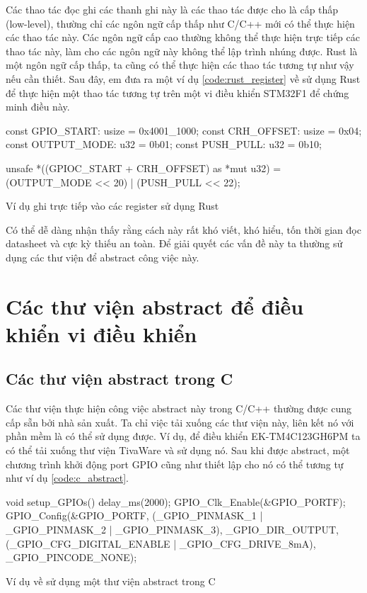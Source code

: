 Các thao tác đọc ghi các thanh ghi này là các thao tác được cho là cấp thấp (low-level), thường chỉ các ngôn ngữ cấp thấp như C/C++ mới có thể thực hiện các thao tác này.
Các ngôn ngữ cấp cao thường không thể thực hiện trực tiếp các thao tác này, làm cho các ngôn ngữ này không thể lập trình nhúng được.
Rust là một ngôn ngữ cấp thấp,  ta cũng có thể thực hiện các thao tác tương tự như vậy nếu cần thiết.
Sau đây, em đưa ra một ví dụ \ref{code:rust_register} về sử dụng Rust để thực hiện một thao tác tương tự trên một vi điều khiển STM32F1 để chứng minh điều này.
\begin{listing}[ht]
\begin{rustcode}
const GPIO_START: usize = 0x4001_1000;
const CRH_OFFSET: usize = 0x04;
const OUTPUT_MODE: u32 = 0b01;
const PUSH_PULL: u32 = 0b10;

unsafe {
    *((GPIOC_START + CRH_OFFSET) as *mut u32) = (OUTPUT_MODE << 20) | (PUSH_PULL << 22);
}
\end{rustcode}
\caption{Ví dụ ghi trực tiếp vào các register sử dụng Rust}
\label{code:rust_register}
\end{listing}

Có thể dễ dàng nhận thấy rằng cách này rất khó viết, khó hiểu, tốn thời gian đọc datasheet và cực kỳ thiếu an toàn.
Để giải quyết các vấn đề này ta thường sử dụng các thư viện để abstract công việc này.
\section{Các thư viện abstract để điều khiển vi điều khiển}
\subsection{Các thư viện abstract trong C}
Các thư viện thực hiện công việc abstract này trong C/C++ thường được cung cấp sẵn bởi nhà sản xuất.
Ta chỉ việc tải xuống các thư viện này, liên kết nó với phần mềm là có thể sử dụng được.
Ví dụ, để điều khiển EK-TM4C123GH6PM ta có thể tải xuống thư viện TivaWare \cite{tivac_tivaware} và sử dụng nó.
Sau khi được abstract, một chương trình khởi động port GPIO cũng như thiết lập cho nó có thể tương tự như ví dụ \ref{code:c_abstract}.
\begin{listing}[ht]
\begin{ccode}
void setup_GPIOs()
{
     delay_ms(2000);
     GPIO_Clk_Enable(&GPIO_PORTF);
     GPIO_Config(&GPIO_PORTF,
                 (_GPIO_PINMASK_1 | _GPIO_PINMASK_2 | _GPIO_PINMASK_3),
                 _GPIO_DIR_OUTPUT,
                 (_GPIO_CFG_DIGITAL_ENABLE | _GPIO_CFG_DRIVE_8mA),
                 _GPIO_PINCODE_NONE);
}
\end{ccode}
\caption{Ví dụ về sử dụng một thư viện abstract trong C}
\label{code:c_abstract}
\end{listing}

